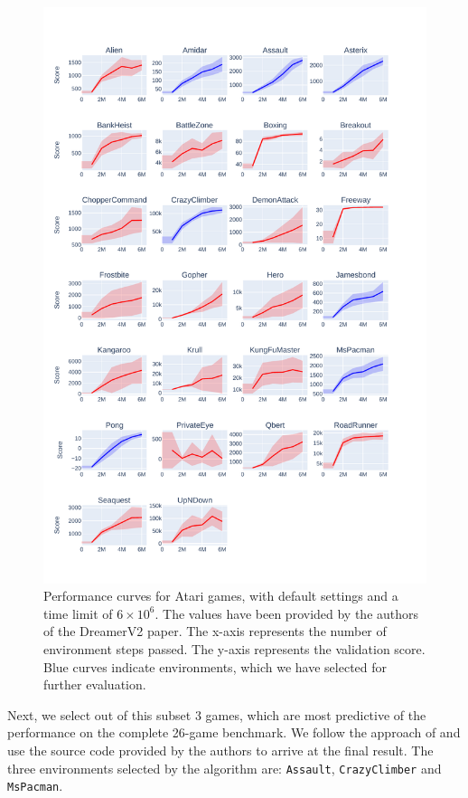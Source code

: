 \documentclass[en]{pracamgr}
\newcommand{\env}[1]{{\tt #1}}
\newcommand{\figurewidth}{\linewidth}
\begin{document}
\begin{figure}
  \centering
  \includegraphics[width=\figurewidth,height=0.6\paperheight,keepaspectratio]{assets/env_selection.pdf}
  \caption{Performance curves for Atari games, with default settings and a time limit of $6 \times 10^6$. The values have been provided by the authors of the DreamerV2 paper. The x-axis represents the number of environment steps passed. The y-axis represents the validation score. Blue curves indicate environments, which we have selected for further evaluation.}
  \label{fig:atari_100k_comp}
\end{figure}

Next, we select out of this subset 3 games, which are most predictive of the performance on the complete 26-game benchmark. We follow the approach of \autocite{aitchisonAtari5DistillingArcade2022} and use the source code provided by the authors to arrive at the final result. The three environments selected by the algorithm are: \env{Assault}, \env{CrazyClimber} and \env{MsPacman}.
\end{document}
